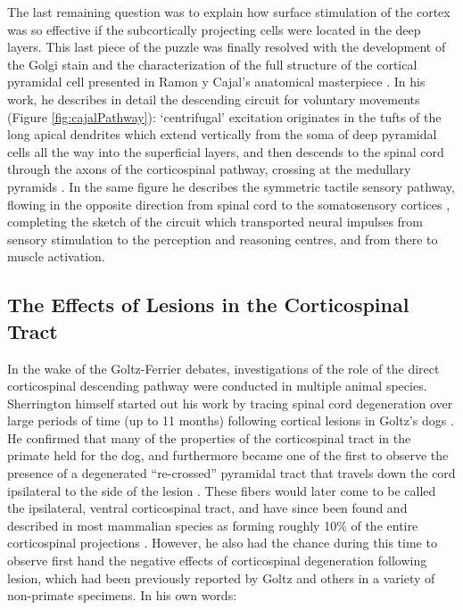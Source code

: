 The last remaining question was to explain how surface stimulation of the cortex was so effective if the subcortically projecting cells were located in the deep layers. This last piece of the puzzle was finally resolved with the development of the Golgi stain and the characterization of the full structure of the cortical pyramidal cell presented in Ramon y Cajal's anatomical masterpiece \cite{RamonYCajal1894,RamonYCajal1909}. In his work, he describes in detail the descending circuit for voluntary movements (Figure \ref{fig:cajalPathway}): ‘centrifugal’ excitation originates in the tufts of the long apical dendrites which extend vertically from the soma of deep pyramidal cells all the way into the superficial layers, and then descends to the spinal cord through the axons of the corticospinal pathway, crossing at the medullary pyramids \cite{RamonYCajal1909}. In the same figure he describes the symmetric tactile sensory pathway, flowing in the opposite direction from spinal cord to the somatosensory cortices \cite{RamonYCajal1909}, completing the sketch of the circuit which transported neural impulses from sensory stimulation to the perception and reasoning centres, and from there to muscle activation.

\subsection{The Effects of Lesions in the Corticospinal Tract}

In the wake of the Goltz-Ferrier debates, investigations of the role of the direct corticospinal descending pathway were conducted in multiple animal species. Sherrington himself started out his work by tracing spinal cord degeneration over large periods of time (up to 11 months) following cortical lesions in Goltz's dogs \cite{Langley1884,Sherrington1885}. He confirmed that many of the properties of the corticospinal tract in the primate held for the dog, and furthermore became one of the first to observe the presence of a degenerated ``re-crossed'' pyramidal tract that travels down the cord ipsilateral to the side of the lesion \cite{Sherrington1885}. These fibers would later come to be called the ipsilateral, ventral corticospinal tract, and have since been found and described in most mammalian species as forming roughly 10\% of the entire corticospinal projections \cite{Kuypers1981,Brosamle2000,Lacroix2004}. However, he also had the chance during this time to observe first hand the negative effects of corticospinal degeneration following lesion, which had been previously reported by Goltz and others in a variety of non-primate specimens. In his own words:

